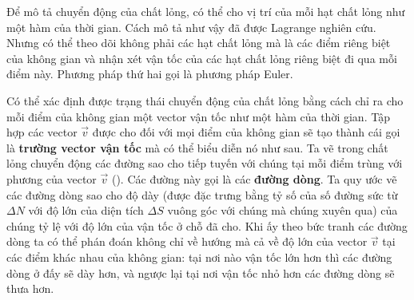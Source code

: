 Để mô tả chuyển động của chất lỏng, có thể cho vị trí của mỗi hạt chất lỏng như một hàm của thời gian. Cách mô tả như vậy đã được Lagrange nghiên cứu. Nhưng có thể theo dõi không phải các hạt chất lỏng mà là các điểm riêng biệt của không gian và nhận xét vận tốc của các hạt chất lỏng riêng biệt đi qua mỗi điểm này. Phương pháp thứ hai gọi là phương pháp Euler.


Có thể xác định được trạng thái chuyển động của chất lỏng bằng cách chỉ ra cho mỗi điểm của không gian một vector vận tốc như một hàm của thời gian. Tập hợp các vector $\vec{v}$ được cho đối với mọi điểm của không gian sẽ tạo thành cái gọi là \textbf{trường vector vận tốc} mà có thể biểu diễn nó như sau. Ta vẽ trong chất lỏng chuyển động các đường sao cho tiếp tuyến với chúng tại mỗi điểm trùng với phương của vector $\vec{v}$ (). Các đường này gọi là các \textbf{đường dòng}. Ta quy ước vẽ các đường dòng sao cho độ dày (được đặc trưng bằng tỷ số của số đường sức từ  $\Delta N$ với độ lớn của diện tích $\Delta S$ vuông góc với chúng mà chúng xuyên qua) của chúng tỷ lệ với độ lớn của vận tốc ở chỗ đã cho. Khi ấy theo bức tranh các đường dòng ta có thể phán đoán không chỉ về hướng mà cả về độ lớn của vector $\vec{v}$ tại các điểm khác nhau của không gian: tại nơi nào vận tốc lớn hơn thì các đường dòng ở đấy sẽ dày hơn, và ngược lại tại nơi vận tốc nhỏ hơn các đường dòng sẽ thưa hơn.


